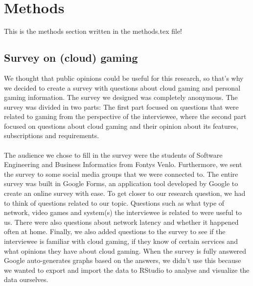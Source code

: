 \section{Methods}
This is the methods section written in the methods.tex file!

\subsection{Survey on (cloud) gaming}
We thought that public opinions could be useful for this research, so that's why we decided to create a survey with questions about cloud gaming and personal gaming information. The survey we designed was completely anonymous. The survey was divided in two parts: The first part focused on questions that were related to gaming from the perspective of the interviewee, where the second part focused on questions about cloud gaming and their opinion about its features, subscriptions and requirements.
\\\\
The audience we chose to fill in the survey were the students of Software Engineering and Business Informatics from Fontys Venlo. Furthermore, we sent the survey to some social media groups that we were connected to. The entire survey was built in Google Forms, an application tool developed by Google to create an online survey with ease. To get closer to our research question, we had to think of questions related to our topic. 
Questions such as what type of network, video games and system(s) the interviewee is related to were useful to us. There were also questions about network latency and whether it happened often at home. Finally, we also added questions to the survey to see if the interviewee is familiar with cloud gaming, if they know of certain services and what opinions they have about cloud gaming. When the survey is fully answered Google auto-generates graphs based on the answers, we didn't use this because we wanted to export and import the data to RStudio to analyse and visualize the data ourselves.
\\\\
